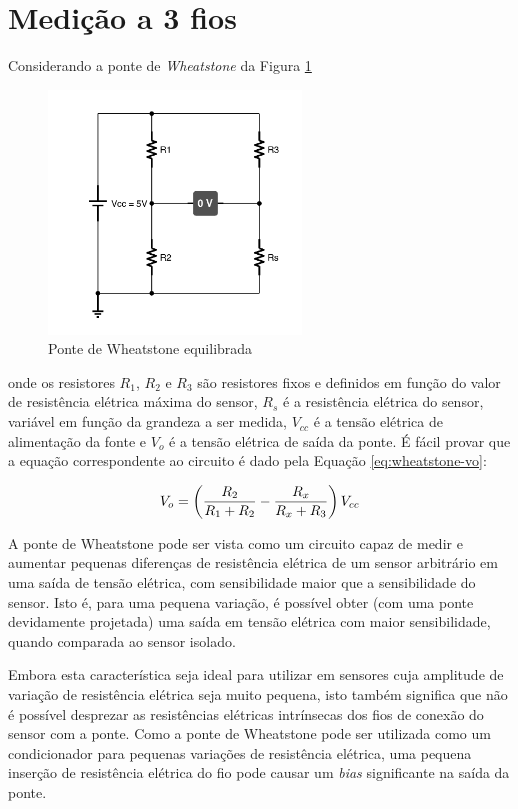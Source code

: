 \documentclass[a4paper]{instrumentacao}
\begin{document}
\section{Medição a 3 fios}

Considerando a ponte de \textit{Wheatstone} da Figura \ref{fig:3fios-wheatstone}

\begin{figure}[H]
\centering
\includegraphics[width=0.6\textwidth]{Wheatstone-Bridge.pdf}
\caption{Ponte de Wheatstone equilibrada}
\label{fig:3fios-wheatstone}
\end{figure}

\noindent onde os resistores $R_1$, $R_2$ e $R_3$ são resistores fixos e definidos em função do valor de resistência elétrica máxima do sensor, $R_s$ é a resistência elétrica do sensor, variável em função da grandeza a ser medida, $V_{cc}$ é a tensão elétrica de alimentação da fonte e $V_o$ é a tensão elétrica de saída da ponte. É fácil provar que a equação correspondente ao circuito é dado pela Equação \ref{eq:wheatstone-vo}:

\begin{equation}
	V_o = \left({{R_2}\over{R_1 + R_2}} - {{R_x}\over{R_x + R_3}}\right)V_{cc}
	\label{eq:wheatstone-vo}
\end{equation}

A ponte de Wheatstone pode ser vista como um circuito capaz de medir e aumentar pequenas diferenças de resistência elétrica de um sensor arbitrário em uma saída de tensão elétrica, com sensibilidade maior que a sensibilidade do sensor. Isto é, para uma pequena variação, é possível obter (com uma ponte devidamente projetada) uma saída em tensão elétrica com maior sensibilidade, quando comparada ao sensor isolado.

Embora esta característica seja ideal para utilizar em sensores cuja amplitude de variação de resistência elétrica seja muito pequena, isto também significa que não é possível desprezar as resistências elétricas intrínsecas dos fios de conexão do sensor com a ponte. Como a ponte de Wheatstone pode ser utilizada como um condicionador para pequenas variações de resistência elétrica, uma pequena inserção de resistência elétrica do fio pode causar um \textit{bias} significante na saída da ponte.
\end{document}
